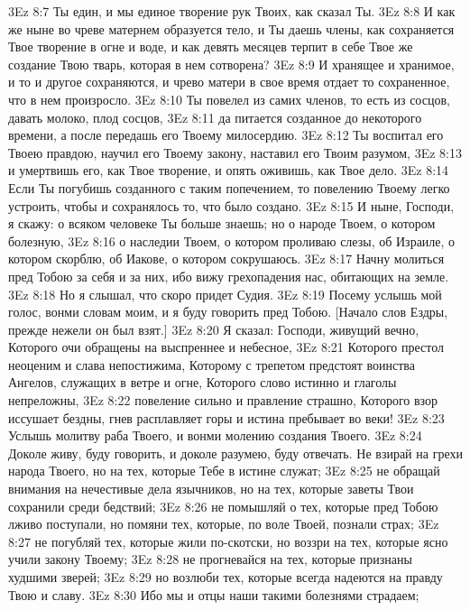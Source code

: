 \vs 3Ez 8:7 Ты един, и мы единое творение рук Твоих, как сказал Ты.
\vs 3Ez 8:8 И как же ныне во чреве матернем образуется тело, и Ты даешь члены, как сохраняется Твое творение в огне и воде, и как девять месяцев терпит в себе Твое же создание Твою тварь, которая в нем сотворена?
\vs 3Ez 8:9 И хранящее и хранимое, и то и другое сохраняются, и чрево матери в свое время отдает то сохраненное, что в нем произросло.
\vs 3Ez 8:10 Ты повелел из самих членов, то есть из сосцов, давать молоко, плод сосцов,
\vs 3Ez 8:11 да питается созданное до некоторого времени, а после передашь его Твоему милосердию.
\vs 3Ez 8:12 Ты воспитал его Твоею правдою, научил его Твоему закону, наставил его Твоим разумом,
\vs 3Ez 8:13 и умертвишь его, как Твое творение, и опять оживишь, как Твое дело.
\vs 3Ez 8:14 Если Ты погубишь созданного с таким попечением, то повелению Твоему легко устроить, чтобы и сохранялось то, что было создано.
\vs 3Ez 8:15 И ныне, Господи, я скажу: о всяком человеке Ты больше знаешь; но  о народе Твоем, о котором болезную,
\vs 3Ez 8:16 о наследии Твоем, о котором проливаю слезы, об Израиле, о котором скорблю, об Иакове, о котором сокрушаюсь.
\vs 3Ez 8:17 Начну молиться пред Тобою за себя и за них, ибо вижу грехопадения нас, обитающих на земле.
\vs 3Ez 8:18 Но я слышал, что скоро придет Судия.
\vs 3Ez 8:19 Посему услышь мой голос, вонми словам моим, и я буду говорить пред Тобою. [Начало слов Ездры, прежде нежели он был взят.]
\vs 3Ez 8:20 Я сказал: Господи, живущий вечно, Которого очи обращены на выспреннее и небесное,
\vs 3Ez 8:21 Которого престол неоценим и слава непостижима, Которому с трепетом предстоят воинства Ангелов, служащих в ветре и огне, Которого слово истинно и глаголы непреложны,
\vs 3Ez 8:22 повеление сильно и правление страшно, Которого взор иссушает бездны, гнев расплавляет горы и истина пребывает во веки!
\vs 3Ez 8:23 Услышь молитву раба Твоего, и вонми молению создания Твоего.
\vs 3Ez 8:24 Доколе живу, буду говорить, и доколе разумею, буду отвечать. Не взирай на грехи народа Твоего, но на тех, которые Тебе в истине служат;
\vs 3Ez 8:25 не обращай внимания на нечестивые дела язычников, но на тех, которые заветы Твои сохранили среди бедствий;
\vs 3Ez 8:26 не помышляй о тех, которые пред Тобою лживо поступали, но помяни тех, которые, по воле Твоей, познали страх;
\vs 3Ez 8:27 не погубляй тех, которые жили по-скотски, но воззри на тех, которые ясно учили закону Твоему;
\vs 3Ez 8:28 не прогневайся на тех, которые признаны худшими зверей;
\vs 3Ez 8:29 но возлюби тех, которые всегда надеются на правду Твою и славу.
\vs 3Ez 8:30 Ибо мы и отцы наши такими болезнями страдаем;
